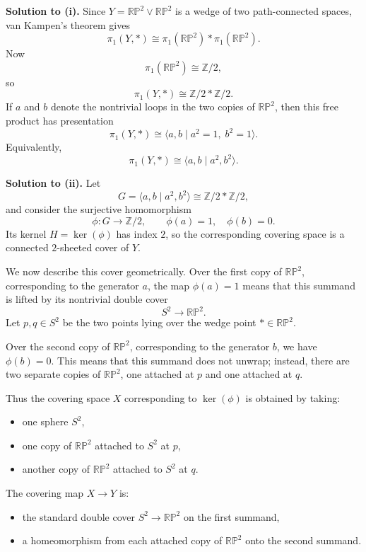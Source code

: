 \documentclass[12pt,a4paper]{article}
\theoremstyle{notespace}
\begin{document}
\medskip

\textbf{Solution to (i).}
Since \(Y=\mathbb{RP}^2\vee \mathbb{RP}^2\) is a wedge of two path-connected spaces, van Kampen's theorem gives
\[
\pi_1(Y,*)\cong \pi_1(\mathbb{RP}^2)*\pi_1(\mathbb{RP}^2).
\]
Now
\[
\pi_1(\mathbb{RP}^2)\cong \mathbb Z/2,
\]
so
\[
\pi_1(Y,*)\cong \mathbb Z/2 * \mathbb Z/2.
\]
If \(a\) and \(b\) denote the nontrivial loops in the two copies of \(\mathbb{RP}^2\), then this free product has presentation
\[
\pi_1(Y,*)\cong \langle a,b \mid a^2=1,\; b^2=1\rangle.
\]
Equivalently,
\[
\pi_1(Y,*)\cong \langle a,b \mid a^2,b^2\rangle.
\]

\medskip

\textbf{Solution to (ii).}
Let
\[
G=\langle a,b \mid a^2,b^2\rangle \cong \mathbb Z/2 * \mathbb Z/2,
\]
and consider the surjective homomorphism
\[
\phi:G\to \mathbb Z/2,\qquad \phi(a)=1,\quad \phi(b)=0.
\]
Its kernel \(H=\ker(\phi)\) has index \(2\), so the corresponding covering space is a connected \(2\)-sheeted cover of \(Y\).

We now describe this cover geometrically. Over the first copy of \(\mathbb{RP}^2\), corresponding to the generator \(a\), the map \(\phi(a)=1\) means that this summand is lifted by its nontrivial double cover
\[
S^2 \longrightarrow \mathbb{RP}^2.
\]
Let \(p,q\in S^2\) be the two points lying over the wedge point \(*\in \mathbb{RP}^2\).

Over the second copy of \(\mathbb{RP}^2\), corresponding to the generator \(b\), we have \(\phi(b)=0\). This means that this summand does not unwrap; instead, there are two separate copies of \(\mathbb{RP}^2\), one attached at \(p\) and one attached at \(q\).

Thus the covering space \(X\) corresponding to \(\ker(\phi)\) is obtained by taking:
\begin{itemize}
	\item one sphere \(S^2\),
	\item one copy of \(\mathbb{RP}^2\) attached to \(S^2\) at \(p\),
	\item another copy of \(\mathbb{RP}^2\) attached to \(S^2\) at \(q\).
\end{itemize}

The covering map \(X\to Y\) is:
\begin{itemize}
	\item the standard double cover \(S^2\to \mathbb{RP}^2\) on the first summand,
	\item a homeomorphism from each attached copy of \(\mathbb{RP}^2\) onto the second summand.
\end{itemize}
\end{document}
